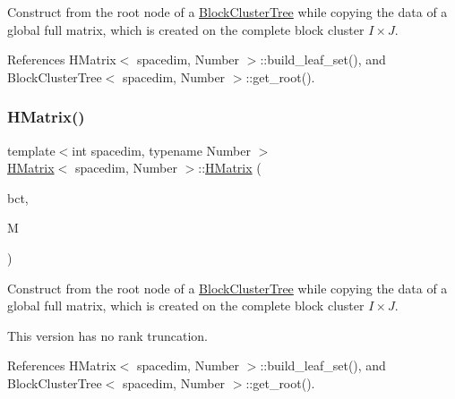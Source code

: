 Construct from the root node of a \hyperlink{classBlockClusterTree}{Block\+Cluster\+Tree} while copying the data of a global full matrix, which is created on the complete block cluster $I \times J$. 

References H\+Matrix$<$ spacedim, Number $>$\+::build\+\_\+leaf\+\_\+set(), and Block\+Cluster\+Tree$<$ spacedim, Number $>$\+::get\+\_\+root().

\mbox{\label{classHMatrix_af72a32400b866e633dda058c949d4f79}} 
\subsubsection{\texorpdfstring{H\+Matrix()}{HMatrix()}\hspace{0.1cm}{\footnotesize\ttfamily [5/11]}}
{\footnotesize\ttfamily template$<$int spacedim, typename Number $>$ \\
\hyperlink{classHMatrix}{H\+Matrix}$<$ spacedim, Number $>$\+::\hyperlink{classHMatrix}{H\+Matrix} (\begin{DoxyParamCaption}\item[{const \hyperlink{classBlockClusterTree}{Block\+Cluster\+Tree}$<$ spacedim, Number $>$ \&}]{bct,  }\item[{const \hyperlink{classLAPACKFullMatrixExt}{L\+A\+P\+A\+C\+K\+Full\+Matrix\+Ext}$<$ Number $>$ \&}]{M }\end{DoxyParamCaption})}

Construct from the root node of a \hyperlink{classBlockClusterTree}{Block\+Cluster\+Tree} while copying the data of a global full matrix, which is created on the complete block cluster $I \times J$.

This version has no rank truncation. 

References H\+Matrix$<$ spacedim, Number $>$\+::build\+\_\+leaf\+\_\+set(), and Block\+Cluster\+Tree$<$ spacedim, Number $>$\+::get\+\_\+root().

\mbox{\label{classHMatrix_a3d444d5d8d3d88e31b7c1046c29017fd}} 
